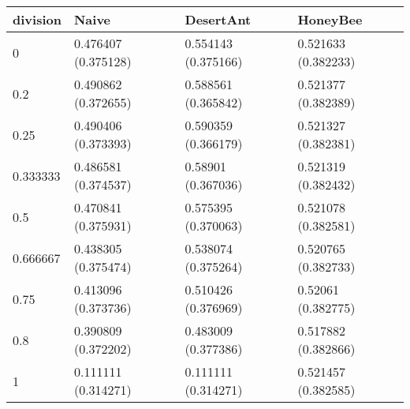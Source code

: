 \begin{tabular} {|l|l|l|l|}
\hline
division & Naive & DesertAnt & HoneyBee \\
\hline
0 & 0.476407 (0.375128)  & 0.554143 (0.375166)  & 0.521633 (0.382233)  \\
0.2 & 0.490862 (0.372655)  & 0.588561 (0.365842)  & 0.521377 (0.382389)  \\
0.25 & 0.490406 (0.373393)  & 0.590359 (0.366179)  & 0.521327 (0.382381)  \\
0.333333 & 0.486581 (0.374537)  & 0.58901 (0.367036)  & 0.521319 (0.382432)  \\
0.5 & 0.470841 (0.375931)  & 0.575395 (0.370063)  & 0.521078 (0.382581)  \\
0.666667 & 0.438305 (0.375474)  & 0.538074 (0.375264)  & 0.520765 (0.382733)  \\
0.75 & 0.413096 (0.373736)  & 0.510426 (0.376969)  & 0.52061 (0.382775)  \\
0.8 & 0.390809 (0.372202)  & 0.483009 (0.377386)  & 0.517882 (0.382866)  \\
1 & 0.111111 (0.314271)  & 0.111111 (0.314271)  & 0.521457 (0.382585)  \\
\hline
\end{tabular}
